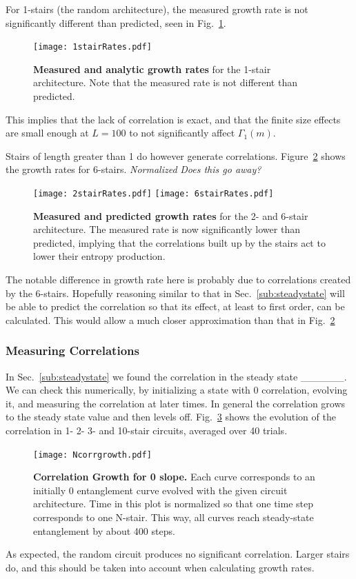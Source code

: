 For 1-stairs (the random architecture), the measured growth rate is not significantly different than predicted, seen in Fig.~\ref{fig:1stairRates}.
\begin{figure}
	\centering
	\texttt{[image: 1stairRates.pdf]}
	\caption{\textbf{Measured and analytic growth rates} for the 1-stair architecture. Note that the measured rate is not different than predicted.}
	\label{fig:1stairRates}
\end{figure}
This implies that the lack of correlation is exact, and that the finite size effects are small enough at $L=100$ to not significantly affect $\Gamma_1(m)$.

Stairs of length greater than 1 do however generate correlations. Figure~\ref{fig:6stairRates} shows the growth rates for 6-stairs. 
\emph{Normalized}
\emph{Does this go away?}
\begin{figure}
	\centering
	\texttt{[image: 2stairRates.pdf]}
	\texttt{[image: 6stairRates.pdf]}
	\caption{\textbf{Measured and predicted growth rates} for the 2- and 6-stair architecture. The measured rate is now significantly lower than predicted, implying that the correlations built up by the stairs act to lower their entropy production.}
	\label{fig:6stairRates}
\end{figure}
The notable difference in growth rate here is probably due to correlations created by the 6-stairs. Hopefully reasoning similar to that in Sec.~\ref{sub:steadystate} will be able to predict the correlation so that its effect, at least to first order, can be calculated. This would allow a much closer approximation than that in Fig.~\ref{fig:6stairRates}

\subsubsection{Measuring Correlations}  \label{subsub:correlations}

In Sec.~\ref{sub:steadystate} we found the correlation in the steady state \_\_\_\_\_\_. We can check this numerically, by initializing a state with 0 correlation, evolving it, and measuring the correlation at later times. In general the correlation grows to the steady state value and then levels off. Fig.~\ref{fig:corrgrowth} shows the evolution of the correlation in 1- 2- 3- and 10-stair circuits, averaged over 40 trials.
\begin{figure}
	\centering
	\texttt{[image: Ncorrgrowth.pdf]}
	\caption{\textbf{Correlation Growth for 0 slope.} Each curve corresponds to an initially 0 entanglement curve evolved with the given circuit architecture. Time in this plot is normalized so that one time step corresponds to one N-stair. This way, all curves reach steady-state entanglement by about 400 steps.
	}
	\label{fig:corrgrowth}
\end{figure}
As expected, the random circuit produces no significant correlation. Larger stairs do, and this should be taken into account when calculating growth rates. 

